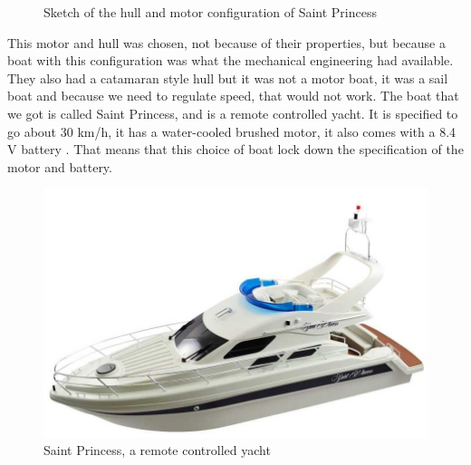 \begin{figure}[H]
	\centering
	\hfill
	\caption{Sketch of the hull and motor configuration of Saint Princess}
\end{figure}
This motor and hull was chosen, not because of their properties, but because a boat with this configuration was what the mechanical engineering had available. They also had a catamaran style hull but it was not a motor boat, it was a sail boat and because we need to regulate speed, that would not work. The boat that we got is called Saint Princess, and is a remote controlled yacht. It is specified to go about 30 km/h, it has a water-cooled brushed motor, it also comes with a 8.4 V battery \cite{saint_princess}. That means that this choice of boat lock down the specification of the motor and battery.

\begin{figure}[H]
\centering
\includegraphics[width=1\linewidth]{Images/Design/saint_princess}
\caption{Saint Princess, a remote controlled yacht\cite{saint_princess}}
\label{fig:saintprincess}
\end{figure}


